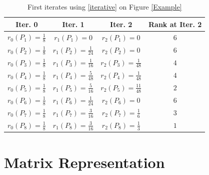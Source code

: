 \documentclass[11pt]{report}
\begin{document}
\begin{table}[H] \caption{First iterates using \eqref{iterative} on Figure \ref{Example}}
 \centering
 \begin{tabular} {c c c |c} 
 Iter. 0 & Iter. 1 & Iter. 2 &  Rank at Iter. 2 \\ [0.5ex] 
 \hline
 $r_0(P_1)=\frac{1}{8}$ & $r_1(P_1)=0$ & $r_2(P_1)=0$ & $6$ \\ 
 $r_0(P_2)=\frac{1}{8}$ & $r_1(P_2)=\frac{1}{24}$ & $r_2(P_2)=0$ & $6$ \\ 
 $r_0(P_3)=\frac{1}{8}$ & $r_1(P_3)=\frac{1}{16}$ & $r_2(P_3)=\frac{1}{48}$ & $4$ \\ 
 $r_0(P_4)=\frac{1}{8}$ & $r_1(P_4)=\frac{5}{48}$ & $r_2(P_4)=\frac{1}{48}$ & $4$ \\ 
 $r_0(P_5)=\frac{1}{8}$ & $r_1(P_5)=\frac{5}{16}$ & $r_2(P_5)=\frac{11}{48}$ & $2$ \\ 
 $r_0(P_6)=\frac{1}{8}$ & $r_1(P_6)=\frac{1}{24}$ & $r_2(P_6)=0$ & $6$ \\ 
 $r_0(P_7)=\frac{1}{8}$ & $r_1(P_7)=\frac{3}{16}$ & $r_2(P_7)=\frac{1}{6}$ & $3$ \\ 
 $r_0(P_8)=\frac{1}{8}$ & $r_1(P_8)=\frac{3}{16}$ & $r_2(P_8)=\frac{1}{3}$ & $1$ \\ \end{tabular}
\label{table1}
\end{table}

\section{Matrix Representation} \label{sec:matrix}
\end{document}
